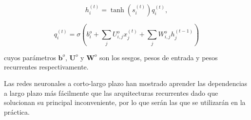 	\begin{equation}
		h_i^{(t)} = \tanh \left(s_i^{(t)} \right) q_i^{(t)},
	\end{equation}
	
	\begin{equation}
	q_i^{(t)} =  \sigma \left( b_i^o+ \sum_{j}U_{i,j}^o x_j^{(t)} + \sum_{j} W_{i,j}^o h_j^{(t-1)}\right)
	\end{equation} 
	
	cuyos parámetros $\textbf{b}^o$,   $\textbf{U}^o$ y  $\textbf{W}^o$ son los sesgos, pesos de entrada y pesos recurrentes respectivamente. 

	\vspace{1cm}

	Las redes neuronales a corto-largo plazo han mostrado aprender las dependencias a largo plazo más fácilmente que las arquitecturas recurrentes dado que solucionan su principal inconveniente, por lo que serán las que se utilizarán en la práctica.